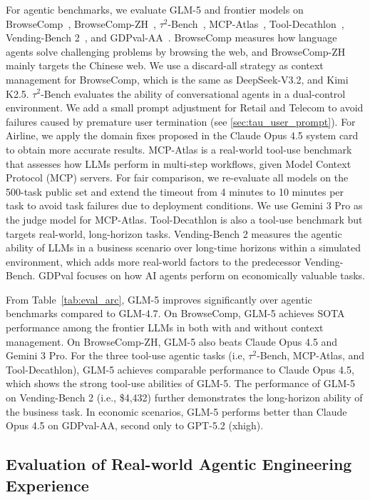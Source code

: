 For agentic benchmarks, we evaluate GLM-5 and frontier models on BrowseComp~\cite{wei2025browsecomp}, BrowseComp-ZH~\cite{zhou2025browsecompzh}, $\tau^2$-Bench~\cite{barres2025tau2}, MCP-Atlas~\cite{bandi2026mcp}, Tool-Decathlon~\cite{li2025tool}, Vending-Bench 2~\cite{backlund2025vending}, and GDPval-AA~\cite{patwardhan2025gdpval}. 
BrowseComp measures how language agents solve challenging problems by browsing the web, and BrowseComp-ZH mainly targets the Chinese web. 
We use a discard-all strategy as context management for BrowseComp, which is the same as DeepSeek-V3.2, and Kimi K2.5. 
$\tau^2$-Bench evaluates the ability of conversational agents in a dual-control environment. We add a small prompt adjustment for Retail and Telecom to avoid failures caused by premature user termination (see \ref{sec:tau_user_prompt}). For Airline, we apply the domain fixes proposed in the Claude Opus 4.5 system card~\cite{opus4.5} to obtain more accurate results.
MCP-Atlas is a real-world tool-use benchmark that assesses how LLMs perform in multi-step workflows, given Model Context Protocol (MCP) servers. For fair comparison, we re-evaluate all models on the 500-task public set and extend the timeout from 4 minutes to 10 minutes per task to avoid task failures due to deployment conditions. We use Gemini 3 Pro as the judge model for MCP-Atlas. 
Tool-Decathlon is also a tool-use benchmark but targets real-world, long-horizon tasks. 
Vending-Bench 2 measures the agentic ability of LLMs in a business scenario over long-time horizons within a simulated environment, which adds more real-world factors to the predecessor Vending-Bench. 
GDPval focuses on how AI agents perform on economically valuable tasks.  

From Table~\ref{tab:eval_arc}, GLM-5 improves significantly over agentic benchmarks compared to GLM-4.7. 
On BrowseComp, GLM-5 achieves SOTA performance among the frontier LLMs in both with and without context management. 
On BrowseComp-ZH, GLM-5 also beats Claude Opus 4.5 and Gemini 3 Pro. 
For the three tool-use agentic tasks (i.e, $\tau^2$-Bench, MCP-Atlas, and Tool-Decathlon), GLM-5 achieves comparable performance to Claude Opus 4.5, which shows the strong tool-use abilities of GLM-5. 
The performance of GLM-5 on Vending-Bench 2 (i.e., \$4,432) further demonstrates the long-horizon ability of the business task. 
In economic scenarios, GLM-5 performs better than Claude Opus 4.5 on GDPval-AA, second only to GPT-5.2 (xhigh). 


\subsection{Evaluation of Real-world Agentic Engineering Experience}

